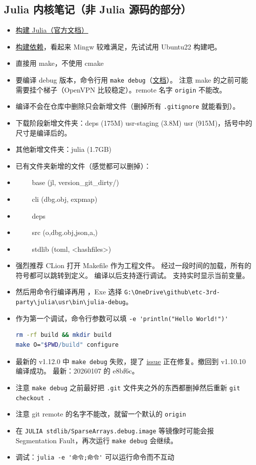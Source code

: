 \subsection{Julia 内核笔记（非 Julia 源码的部分）}
\begin{itemize}
\item \href{https://docs.julialang.org/en/v1/devdocs/build/build/}{构建 Julia（官方文档）}
\item \href{https://docs.julialang.org/en/v1/devdocs/build/build/#Required-Build-Tools-and-External-Libraries}{构建依赖}，看起来 Mingw 较难满足，先试试用 Ubuntu22 构建吧。
\item 直接用 make，不使用 cmake
\item 要编译 debug 版本，命令行用 \verb`make debug`（\href{https://docs.julialang.org/en/v1/devdocs/backtraces/}{文档}）。 注意 make 的之前可能需要挂个梯子（OpenVPN 比较稳定）。remote 名字 \verb`origin` 不能改。
\item 编译不会在仓库中删除只会新增文件（删掉所有 \verb`.gitignore` 就能看到）。
\item 下载阶段新增文件夹：deps (175M) usr-staging (3.8M) usr (915M)，括号中的尺寸是编译后的。
\item 其他新增文件夹：julia (1.7GB)
\item 已有文件夹新增的文件（感觉都可以删掉）：
\item $\qquad$ base (jl, version_git_dirty/)
\item $\qquad$ cli (dbg.obj, expmap)
\item $\qquad$ deps
\item $\qquad$ src (o,dbg.obj,json,a,)
\item $\qquad$ stdlib (toml, <hashfiles>)
\item 强烈推荐 CLion 打开 Makefile 作为工程文件。 经过一段时间的加载，所有的符号都可以跳转到定义。 编译以后支持逐行调试。 支持实时显示当前变量。
\item 然后用命令行编译再用 ，Exe 选择 \verb`G:\OneDrive\github\etc-3rd-party\julia\usr\bin\julia-debug`。
\item 作为第一个调试，命令行参数可以填 \verb`-e 'println("Hello World!")'`
\begin{lstlisting}[language=bash]
rm -rf build && mkdir build
make O="$PWD/build" configure
\end{lstlisting}
\item 最新的 v1.12.0 中 \verb`make debug` 失败，提了 \href{https://github.com/JuliaLang/julia/issues/57675}{issue} 正在修复。撤回到 v1.10.10 编译成功。 最新：20260107 的 e8bf6c。
\item 注意 \verb`make debug` 之前最好把 \verb`.git` 文件夹之外的东西都删掉然后重新 \verb`git checkout .`
\item 注意 git remote 的名字不能改，就留一个默认的 \verb`origin`
\item 在 \verb`JULIA stdlib/SparseArrays.debug.image` 等镜像时可能会报 Segmentation Fault，再次运行 \verb`make debug` 会继续。

\item 调试：\verb`julia -e '命令;命令'` 可以运行命令而不互动
\end{itemize}

